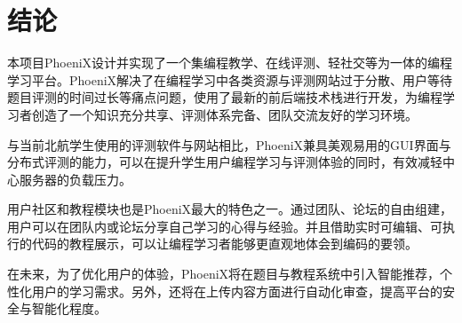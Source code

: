 
\chapter*{结论}
本项目PhoeniX设计并实现了一个集编程教学、在线评测、轻社交等为一体的编程学习平台。PhoeniX解决了在编程学习中各类资源与评测网站过于分散、用户等待题目评测的时间过长等痛点问题，使用了最新的前后端技术栈进行开发，为编程学习者创造了一个知识充分共享、评测体系完备、团队交流友好的学习环境。

与当前北航学生使用的评测软件与网站相比，PhoeniX兼具美观易用的GUI界面与分布式评测的能力，可以在提升学生用户编程学习与评测体验的同时，有效减轻中心服务器的负载压力。

用户社区和教程模块也是PhoeniX最大的特色之一。通过团队、论坛的自由组建，用户可以在团队内或论坛分享自己学习的心得与经验。并且借助实时可编辑、可执行的代码的教程展示，可以让编程学习者能够更直观地体会到编码的要领。

在未来，为了优化用户的体验，PhoeniX将在题目与教程系统中引入智能推荐，个性化用户的学习需求。另外，还将在上传内容方面进行自动化审查，提高平台的安全与智能化程度。

\par
